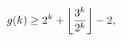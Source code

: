 \[\mathop{g\/}\nolimits\!\left(k\right)\geq 2^{k}+\left\lfloor\frac{3^{k}}{2^{k}%
}\right\rfloor-2,\]